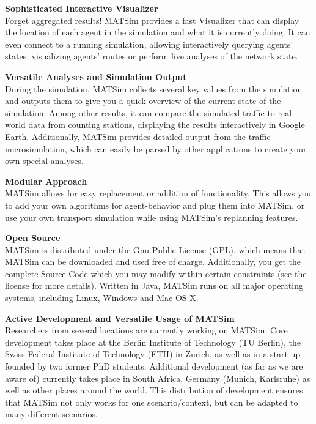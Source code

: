 \documentclass[a4paper,11pt]{report}
\begin{document}
\textbf{Sophisticated Interactive Visualizer}
\\  Forget aggregated results! MATSim provides a fast Visualizer that can  display the location of each agent in the simulation and what it is  currently doing. It can even connect to a running simulation, allowing  interactively querying agents' states, visualizing agents' routes or  perform live analyses of the network state.

\textbf{Versatile Analyses and Simulation Output}
\\  During the simulation, MATSim collects several key values from the  simulation and outputs them to give you a quick overview of the current  state of the simulation. Among other results, it can compare the  simulated traffic to real world data from counting stations, displaying  the results interactively in Google Earth. Additionally, MATSim provides  detailed output from the traffic microsimulation, which can easily be  parsed by other applications to create your own special analyses.

\textbf{Modular Approach
\\}MATSim  allows for easy replacement or addition of functionality. This allows  you to add your own algorithms for agent-behavior and plug them into  MATSim, or use your own transport simulation while using MATSim's  replanning features.

\textbf{Open Source}
\\ MATSim is  distributed under the Gnu Public License (GPL), which means that MATSim  can be downloaded and used free of charge. Additionally, you get the  complete Source Code which you may modify within certain constraints  (see the license for more details). Written in Java, MATSim runs on all  major operating systems, including Linux, Windows and Mac OS X.

\textbf{Active Development and Versatile Usage of MATSim}
\\  Researchers from several locations are currently working on MATSim.  Core development takes place at the Berlin Institute of Technology (TU  Berlin), the Swiss Federal Institute of Technology (ETH) in Zurich, as  well as in a start-up founded by two former PhD students. Additional  development (as far as we are aware of) currently takes place in South  Africa, Germany (Munich, Karlsruhe) as well as other places around the  world. This distribution of development ensures that MATSim not only  works for one scenario/context, but can be adapted to many different  scenarios.
\end{document}
